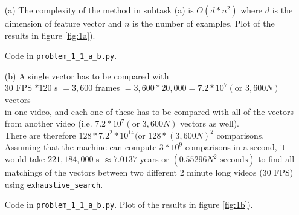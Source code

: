 \documentclass [a4paper, 11pt] {article}
\begin{document}
\begin{enumerate}
	\item[(a)] The complexity of the method in subtask (a) is $O(d*n^2)$ where $d$ is the dimension of feature vector and $n$ is the number of examples. Plot of the results in figure \ref{fig:1a}).
	
	Code in \texttt{problem\_1\_1\_a\_b.py}.
		
	\item[(b)] A single vector has to be compared with \\
	$30$ FPS $* 120$ s $= 3,600$ frames $= 3,600 * 20,000 = 7.2 * 10^7 (\text{or } 3,600N)$ vectors \\
	in one video, and each one of these has to be compared with all of the vectors from another video (i.e. $7.2 * 10^7 (\text{or } 3,600N)$ vectors as well).\\
	There are therefore $128 * {7.2}^2 * 10^{14} (\text{or } 128 * (3,600N)^2$ comparisons. Assuming that the machine can compute $3 * 10^9$ comparisons in a second, it would take $221,184,000$ s $\approx 7.0137$ years or $(0.55296 N^2 \text{ seconds})$ to find all matchings of the vectors between two different 2 minute long videos ($30$ FPS) using \texttt{exhaustive\_search}.
	
	Code in \texttt{problem\_1\_1\_a\_b.py}. Plot of the results in figure \ref{fig:1b}).
	

\end{enumerate}
\end{document}
